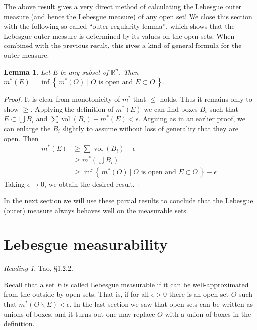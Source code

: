 \documentclass[11pt,oneside]{amsbook}
\newcommand{\set}[1]{\left\{\,#1\,\right\}}
\renewcommand{\setminus}{\smallsetminus}
\newcommand{\RR}{{\mathbb R}}
\DeclareMathOperator{\vol}{vol}
\theoremstyle{definition}
\theoremstyle{plain}
\newtheorem{lem}[thm]{Lemma}
\theoremstyle{definition}
\theoremstyle{remark}
\newtheorem*{reading}{Reading}
\numberwithin{equation}{section}
\numberwithin{figure}{section}
\begin{document}
The above result gives a very direct method of calculating the Lebesgue outer measure (and hence the Lebesgue measure) of any open set! We close this section with the following so-called ``outer regularity lemma'', which shows that the Lebesgue outer measure is determined by its values on the open sets. When combined with the previous result, this gives a kind of general formula for the outer measure.

\begin{lem}
  Let $E$ be any subset of $\RR^n$. Then $m^*(E)=\inf\set{m^*(O)\mid\text{$O$ is open and }E\subset O}$.
\end{lem}

\begin{proof}
  It is clear from monotonicity of $m^*$ that $\leq$ holds. Thus it remains only to show $\geq$. Applying the definition of $m^*(E)$ we can find boxes $B_i$ such that $E\subset\bigcup B_i$ and $\sum\vol(B_i)-m^*(E)<\epsilon$. Arguing as in an earlier proof, we can enlarge the $B_i$ slightly to assume without loss of generality that they are open. Then
  \begin{align*}
    m^*(E)&\geq\sum\vol(B_i)-\epsilon\\
          &\geq m^*(\bigcup B_i)\\
          &\geq \inf\set{m^*(O)\mid\text{$O$ is open and }E\subset O}-\epsilon
  \end{align*}
  Taking $\epsilon\to0$, we obtain the desired result.
\end{proof}

In the next section we will use these partial results to conclude that the Lebesgue (outer) measure always behaves well on the measurable sets.

\newpage
\section{Lebesgue measurability}

\begin{reading}
  Tao, \S 1.2.2.
\end{reading}

Recall that a set $E$ is called Lebesgue measurable if it can be well-approximated from the outside by open sets. That is, if for all $\epsilon>0$ there is an open set $O$ such that $m^*(O\setminus E)<\epsilon$. In the last section we saw that open sets can be written as unions of boxes, and it turns out one may replace $O$ with a union of boxes in the definition.
\end{document}
